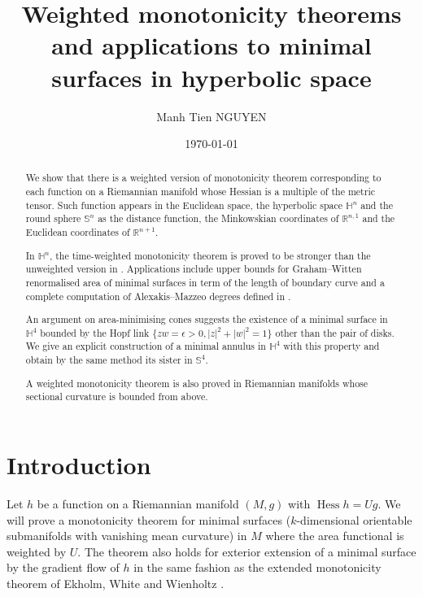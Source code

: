 \documentclass[11pt]{article}
\author{Manh Tien NGUYEN}
\date{\today}
\title{Weighted monotonicity theorems and applications to minimal surfaces in hyperbolic space}
\DeclareMathOperator{\hess}{Hess}
\begin{document}
\maketitle
\begin{abstract}
We show that there is a weighted version of monotonicity theorem corresponding 
to each function on a Riemannian manifold whose Hessian is a multiple of the metric tensor. 
Such function appears in the Euclidean space, the hyperbolic space \( \mathbb{H}^n \) and 
the round sphere \( \mathbb{S}^n \) as the distance function, 
the Minkowskian coordinates of \( \mathbb{R}^{n,1} \) and the Euclidean coordinates of \( \mathbb{R}^{n+1} \). 

In \( \mathbb{H}^n \), the time-weighted monotonicity theorem is proved to be stronger than the unweighted version in 
\cite{Anderson82_CompleteMinimalVarieties}. Applications include upper bounds for Graham--Witten renormalised area 
of minimal surfaces in term of the length of boundary curve and a complete computation of Alexakis--Mazzeo degrees defined in \cite{Alexakis.Mazzeo10_RenormalizedAreaProperly}. 

An argument on area-minimising cones suggests the existence of a minimal surface in \( \mathbb{H}^4 \) bounded by the Hopf
link \( \{zw=\epsilon > 0, |z|^2 +|w|^2 = 1\} \) other than the pair of disks. 
We give an explicit construction of a minimal annulus in \( \mathbb{H}^4 \) with this property and obtain by the same method
its sister in \( \mathbb{S}^4 \).

A weighted monotonicity theorem is also proved in Riemannian manifolds whose sectional curvature is bounded from above.
\end{abstract}
\section{Introduction}
\label{sec:org1ed5148}

Let \(h\) be a function on a Riemannian manifold \((M,g)\) with
\(\hess h = Ug\). We will prove a monotonicity
theorem for minimal surfaces (\(k\)-dimensional orientable submanifolds with vanishing mean
curvature) in \(M\) where the area functional is weighted
by \(U\). The theorem also holds for exterior extension of a minimal surface by the
gradient flow of \(h\) in the same fashion as the extended monotonicity theorem of
Ekholm, White and Wienholtz \cite{Ekholm.etal02_EmbeddednessMinimalSurfaces}.
\end{document}
